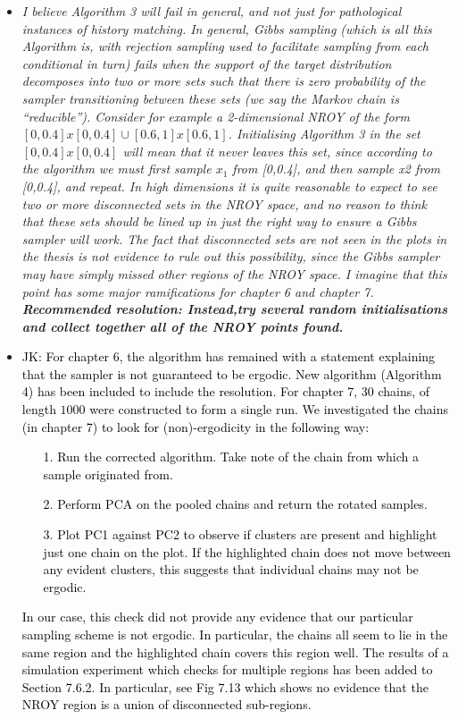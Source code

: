 \documentclass[12pt]{article}
\newcommand{\done}[2]{\item[#1]\textit{#2}}
\newcommand{\jack}[1]{\item{\textcolor{black}{JK: #1}}}
\begin{document}
\begin{itemize}
\done{P149}{I believe Algorithm 3 will fail in general, and not just for pathological instances of history matching.  In general, Gibbs sampling (which is all this Algorithm is, with rejection sampling used to facilitate sampling from each conditional in turn) fails when the support of the target distribution decomposes into two or more sets such that there is zero probability of the sampler transitioning between these sets (we say the Markov chain is ``reducible'').  Consider for example a 2-dimensional NROY of the form $[0,0.4] x [0,0.4] \cup [0.6,1] x [0.6,1]$. Initialising Algorithm 3 in the set $[0,0.4] x [0,0.4]$ will mean that it never leaves this set, since according to the algorithm we must first sample $x_1$ from [0,0.4], and then sample x2 from [0,0.4], and repeat.  In high dimensions it is quite reasonable to expect to see two or more disconnected sets in the NROY space, and no reason to think that these sets should be lined up in just the right way to ensure a Gibbs sampler will work.  The fact that disconnected sets are not seen in the plots in the thesis is not evidence to rule out this possibility, since the Gibbs sampler may have simply missed other regions of the NROY space.  I imagine that this point has some major ramifications for chapter 6 and chapter 7. \textbf{Recommended resolution:  Instead,try several random initialisations and collect together all of the NROY points found.}}

\jack{For chapter 6, the algorithm has remained with a statement explaining that the sampler is not guaranteed to be ergodic. New algorithm (Algorithm 4) has been included to include the resolution. For chapter 7, $30$ chains, of length $1000$ were constructed to form a single run. We investigated the chains (in chapter 7) to look for (non)-ergodicity in the following way:
  \begin{itemize}
    \item[1.] Run the corrected algorithm. Take note of the chain from which a sample originated from.
    \item[2.] Perform PCA on the pooled chains and return the rotated samples.
    \item[3.] Plot PC1 against PC2 to observe if clusters are present and highlight just one chain on the plot. If the highlighted chain does not move between any evident clusters, this suggests that individual chains may not be ergodic.
 \end{itemize}
In our case, this check did not provide any evidence that our particular sampling scheme is not ergodic. In particular, the chains all seem to lie in the same region and the highlighted chain covers this region well. The results of a simulation experiment which checks for multiple regions has been added to Section 7.6.2. In particular, see Fig 7.13 which shows no evidence that the NROY region is a union of disconnected sub-regions.}
\end{itemize}
\end{document}
